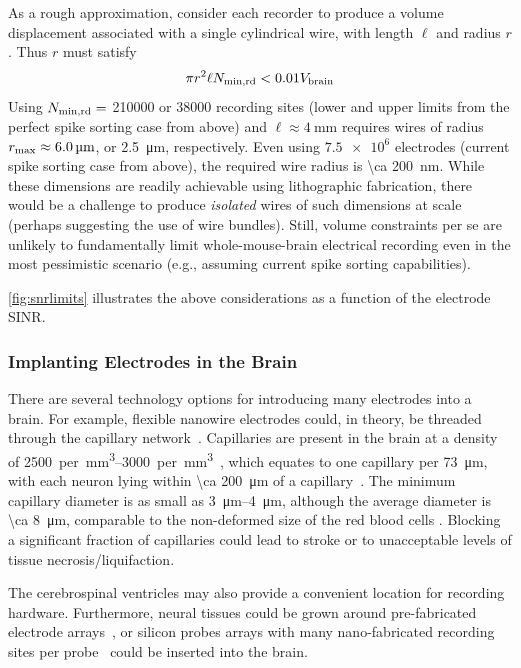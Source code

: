 As a rough approximation, consider each recorder to produce a volume displacement associated with a single cylindrical wire, with length $\ell$ and radius $r$.
Thus $r$ must satisfy \[\pi r^2\ell N_{\text{\scriptsize min,rd}} < 0.01V_{\text{\scriptsize brain}}\]
Using $N_{\text{\scriptsize min,rd}} =$ \num{210000} or \num{38000} recording sites (lower and upper limits from the perfect spike sorting case from above) and $\ell\approx\SI{4}{\milli\meter}$ requires wires of radius $r_{\text{\scriptsize max}} \approx \SI{6.0}{\micro\meter}$, or \SI{2.5}{\micro\meter}, respectively. 
Even using $\num{7.5e6}$ electrodes (current spike sorting case from above), the required wire radius is \SI{\ca 200}{\nano\meter}.
While these dimensions are readily achievable using lithographic fabrication, there would be a challenge to produce \emph{isolated} wires of such dimensions at scale (perhaps suggesting the use of wire bundles).
Still, volume constraints per se are unlikely to fundamentally limit whole-mouse-brain electrical recording even in the most pessimistic scenario (e.g., assuming current spike sorting capabilities).

\autoref{fig:snrlimits} illustrates the above considerations as a function of the electrode SINR.

\subsubsection{Implanting Electrodes in the Brain}

There are several technology options for introducing many electrodes into a brain.
For example, flexible nanowire electrodes could, in theory, be threaded through the capillary network~\cite{llinas05}.
Capillaries are present in the brain at a density of \SIrange{2500}{3000}{per \milli\meter\cubed}~\cite{schmidt89}, which equates to one capillary per \SI{73}{\micro\meter}, with each neuron lying within \SI{\ca 200}{\micro\meter} of a capillary~\cite{loffredo08}. The minimum capillary diameter is as small as \SIrange{3}{4}{\micro\meter}, although the average diameter is \SI{\ca 8}{\micro\meter}, comparable to the non-deformed size of the red blood cells \cite{Freitas1999}. Blocking a significant fraction of capillaries could lead to stroke or to unacceptable levels of tissue necrosis/liquifaction.

The cerebrospinal ventricles may also provide a convenient location for recording hardware. Furthermore, neural tissues could be grown around pre-fabricated electrode arrays~\cite{jadhav12}, or silicon probes arrays with many nano-fabricated recording sites per probe~\cite{du11} could be inserted into the brain.

